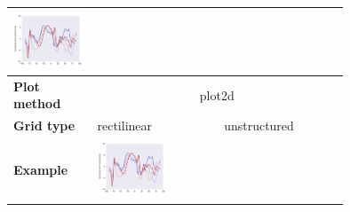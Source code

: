 \documentclass[
11pt, %
english, %
singlespacing, %
headsepline, %
]{MastersDoctoralThesis} %
\begin{document}
\begin{NoHyper}
\begin{refsection}
\begin{subappendices}
\begin{tabular}[c]{l|p{0.25\linewidth}|p{0.25\linewidth}|p{0.25\linewidth}|}
				\includegraphics[width=\linewidth, page=3]{psyplot-figures/psy-simple-demo.pdf} \\
			\midrule
			\midrule
			\textbf{Plot method} & \multicolumn{3}{c}{plot2d} \\
			\hline
			\textbf{Grid type} & rectilinear & \multicolumn{2}{c}{unstructured} \\
			\hline
			\textbf{Example} & 
				\includegraphics[width=\linewidth, page=4]{psyplot-figures/psy-simple-demo.pdf} &

\end{tabular}
\end{subappendices}
\end{refsection}
\end{NoHyper}
\end{document}
